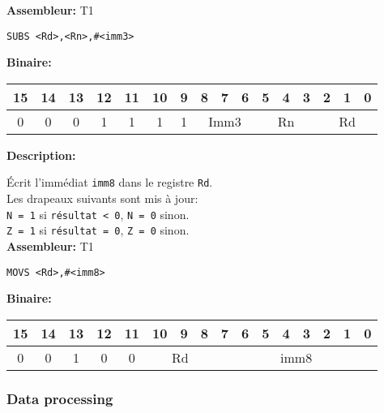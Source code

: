 \textbf{Assembleur:} T1

\begin{lstlisting}
SUBS <Rd>,<Rn>,#<imm3>
\end{lstlisting}

\textbf{Binaire:}\\

\begin{tabular}{| c c c c c c c c c c c c c c c c |}
\hline
15 & 14 & 13 & \multicolumn{1}{|c}{12} & 11 & \multicolumn{1}{|c}{10} & \multicolumn{1}{|c}{9} & \multicolumn{1}{|c}{8} & 7 & 6 & \multicolumn{1}{|c}{5} & 4 & 3 & \multicolumn{1}{|c}{2} & 1 & 0 \\
\hline   
0 & 0 & 0 & \multicolumn{1}{|c}{1} & 1 &  \multicolumn{1}{|c}{1} & \multicolumn{1}{|c}{1} & \multicolumn{3}{|c|}{Imm3} & \multicolumn{3}{|c|}{Rn} & \multicolumn{3}{|c|}{Rd} \\
\hline
\end{tabular}



\textbf{Description: }

Écrit l'immédiat \texttt{imm8} dans le registre \texttt{Rd}.\\
Les drapeaux suivants sont mis à jour:\\
\texttt{N = 1} si \texttt{résultat < 0}, \texttt{N = 0} sinon.\\
\texttt{Z = 1} si \texttt{résultat = 0}, \texttt{Z = 0} sinon.\\

\textbf{Assembleur:} T1

\begin{lstlisting}
MOVS <Rd>,#<imm8>
\end{lstlisting}

\textbf{Binaire:}\\

\begin{tabular}{| c c c c c c c c c c c c c c c c |}
\hline
15 & 14 & 13 & \multicolumn{1}{|c}{12} & 11 & \multicolumn{1}{|c}{10} & 9 & 8 & \multicolumn{1}{|c}{7} & 6 & 5 & 4 & 3 & 2 & 1 & 0 \\
\hline
0 & 0 & 1 & \multicolumn{1}{|c}{0} & 0 & \multicolumn{3}{|c|}{Rd} & \multicolumn{8}{|c|}{imm8} \\
\hline
\end{tabular}


\subsubsection{Data processing}

